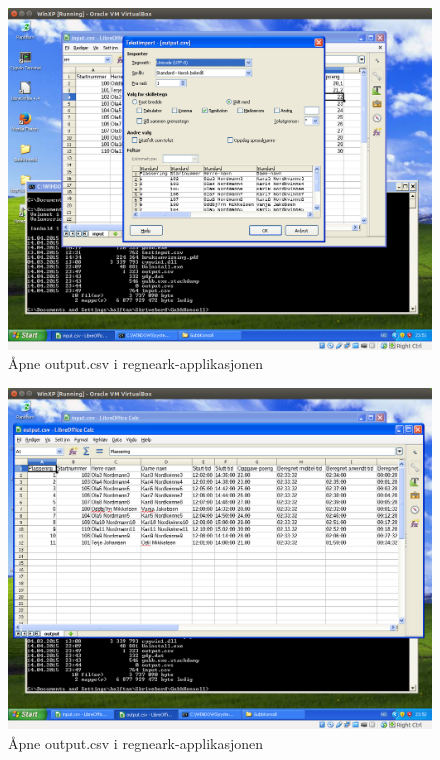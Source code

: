 \documentclass[12pt]{book}
\begin{document}
\begin{figure}[h]
\includegraphics[width=15cm]{016}
\caption{Åpne output.csv i regneark-applikasjonen}
\end{figure}

\begin{figure}[h]
\includegraphics[width=15cm]{017}
\caption{Åpne output.csv i regneark-applikasjonen}
\end{figure}
\end{document}
